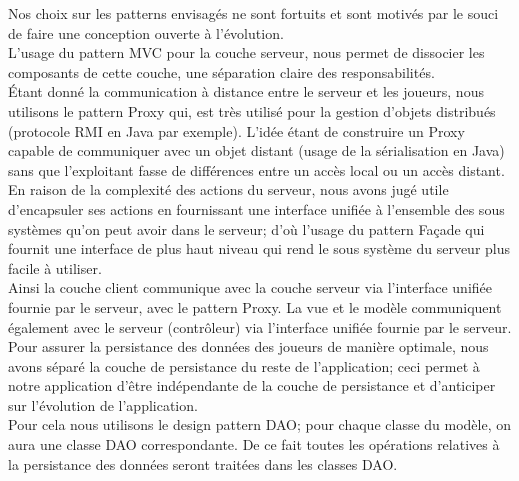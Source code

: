 \par
Nos choix sur les patterns envisagés ne sont fortuits et sont motivés par le souci de faire une conception ouverte à l'évolution. \\

L'usage du pattern MVC pour la couche serveur, nous permet de dissocier les composants de cette couche, une séparation claire des responsabilités. \\

Étant donné la communication à distance entre le serveur et les joueurs, nous utilisons le pattern Proxy qui, est très utilisé pour la gestion d'objets distribués (protocole RMI en Java par exemple). L'idée étant de construire un Proxy capable de communiquer avec un objet distant (usage de la sérialisation en Java) sans que l'exploitant fasse de différences entre un accès local ou un accès distant. \\

En raison de la complexité des actions du serveur, nous avons jugé utile d'encapsuler ses actions en fournissant une interface unifiée à l'ensemble des sous systèmes qu'on peut avoir dans le serveur; d'où l'usage du pattern Façade qui fournit une interface de plus haut niveau qui rend le sous système du serveur plus facile à utiliser. \\

Ainsi la couche client communique avec la couche serveur via l'interface unifiée fournie par le serveur, avec le pattern Proxy. La vue et le modèle communiquent également avec le serveur (contrôleur) via l'interface unifiée fournie par le serveur. \\

Pour assurer la persistance des données des joueurs de manière optimale, nous avons séparé la couche de persistance du reste de l'application; ceci permet à notre application d'être indépendante de la couche de persistance et d'anticiper sur l'évolution de l'application. \\

Pour cela nous utilisons le design pattern DAO; pour chaque classe du modèle, on aura une classe DAO correspondante. De ce fait toutes les opérations relatives à la persistance des données seront traitées dans les classes DAO.